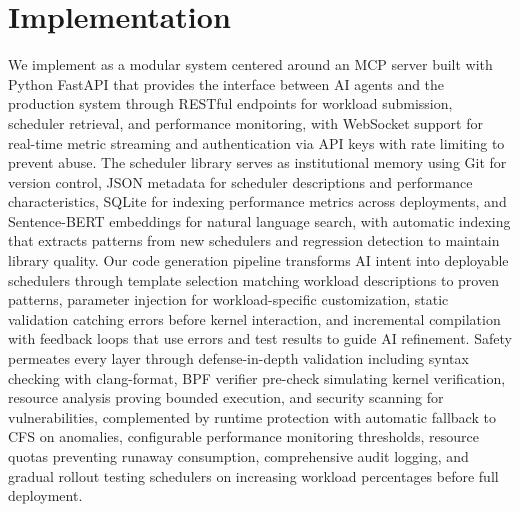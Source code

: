 \section{Implementation}

We implement \sys as a modular system centered around an MCP server built with Python FastAPI that provides the interface between AI agents and the production system through RESTful endpoints for workload submission, scheduler retrieval, and performance monitoring, with WebSocket support for real-time metric streaming and authentication via API keys with rate limiting to prevent abuse. The scheduler library serves as institutional memory using Git for version control, JSON metadata for scheduler descriptions and performance characteristics, SQLite for indexing performance metrics across deployments, and Sentence-BERT embeddings for natural language search, with automatic indexing that extracts patterns from new schedulers and regression detection to maintain library quality. Our code generation pipeline transforms AI intent into deployable schedulers through template selection matching workload descriptions to proven patterns, parameter injection for workload-specific customization, static validation catching errors before kernel interaction, and incremental compilation with feedback loops that use errors and test results to guide AI refinement. Safety permeates every layer through defense-in-depth validation including syntax checking with clang-format, BPF verifier pre-check simulating kernel verification, resource analysis proving bounded execution, and security scanning for vulnerabilities, complemented by runtime protection with automatic fallback to CFS on anomalies, configurable performance monitoring thresholds, resource quotas preventing runaway consumption, comprehensive audit logging, and gradual rollout testing schedulers on increasing workload percentages before full deployment.